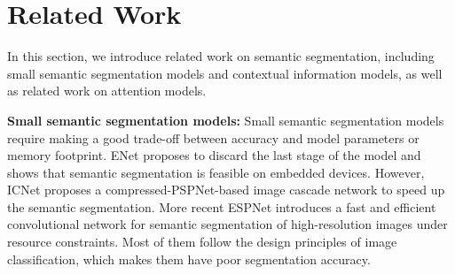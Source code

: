 \documentclass[10pt,twocolumn,letterpaper]{article}
\begin{document}
\section{Related Work}
In this section, we introduce related work on semantic segmentation, including small semantic segmentation models and contextual information models, as well as related work on attention models.

\textbf{Small semantic segmentation models:}\quad
Small semantic segmentation models require making a good trade-off between accuracy and model parameters or memory footprint. ENet \cite{paszke2016enet} proposes to discard the last stage of the model and shows that semantic segmentation is feasible on embedded devices. However,
ICNet \cite{zhaoicnet} proposes a compressed-PSPNet-based image cascade network to speed up the semantic segmentation.
More recent ESPNet \cite{nassar2018deep} introduces a fast and efficient convolutional network for semantic segmentation of high-resolution images under resource constraints.
Most of them follow the design principles of image classification, which makes them have poor segmentation accuracy.
\end{document}
